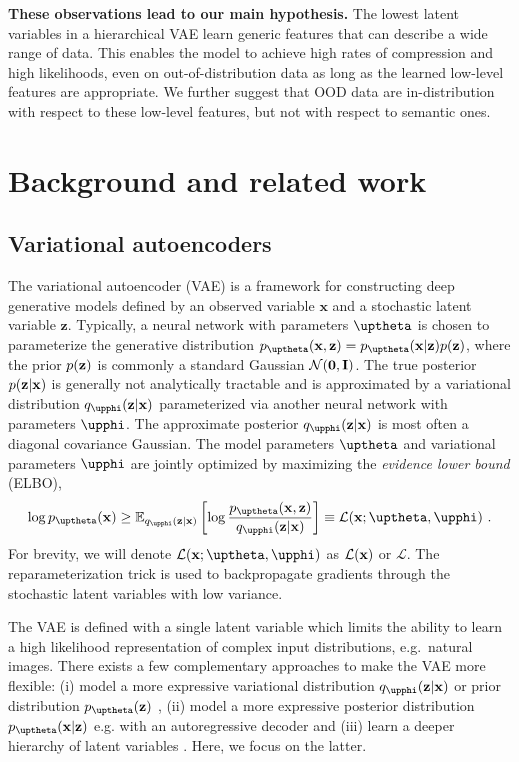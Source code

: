 {\textbf{These observations lead to our main hypothesis.}
The lowest latent variables in a hierarchical VAE learn generic features that can describe a wide range of data.
This enables the model to achieve high rates of compression and high likelihoods, even on out-of-distribution data as long as the learned low-level features are appropriate.
We further suggest that OOD data are in-distribution with respect to these low-level features, but not with respect to semantic ones.

\vspace{0cm}
\section{Background and related work}

\subsection{Variational autoencoders}
The variational autoencoder (VAE) \parencite{kingma_autoencoding_2014, rezende_stochastic_2014} is a framework for constructing deep generative models defined by an observed variable $\mathbf{x}$ and a stochastic latent variable $\mathbf{z}$.
Typically, a neural network with parameters $\thetab$ is chosen to parameterize the generative distribution $p_\thetab(\xb,\zb)=p_\thetab(\xb|\zb)p(\zb)$, where the prior $p({\mathbf{z}})$ is commonly a standard Gaussian $\mathcal{N}({\mathbf{0}}, {\mathbf{I}})$.
The true posterior $p({\mathbf{z}}|{\mathbf{x}})$ is generally not analytically tractable and is approximated by a variational distribution $q_\phib(\zb|\xb)$ parameterized via another neural network with parameters $\phib$. The approximate posterior $q_\phib(\zb|\xb)$ is most often  a diagonal covariance Gaussian.
The model parameters $\thetab$ and variational parameters $\phib$ are jointly optimized by maximizing the \textit{evidence lower bound} (ELBO),
\begin{equation}\label{eq_hierarchical:elbo}
    \log p_\thetab(\xb) \geq \mathbb{E}_{q_\phib(\zb|\xb)} \left[ \log \frac{p_\thetab(\xb,\zb)}{q_\phib(\zb|\xb)} \right] \equiv \mathcal{L}(\xb; \thetab, \phib)\ .
\end{equation}
For brevity, we will denote $\mathcal{L}(\xb; \thetab, \phib)$ as $\mathcal{L}({\mathbf{x}})$ or $\mathcal{L}$. The reparameterization trick is used to backpropagate gradients through the stochastic latent variables with low variance.

The VAE is defined with a single latent variable which limits the ability to learn a high likelihood representation of complex input distributions, e.g.\ natural images.
There exists a few complementary approaches to make the VAE more flexible: (i) model a more expressive variational distribution $q_\phib(\zb|\xb)$ or prior distribution $p_\thetab(\zb)$ \parencite{rezende_variational_2015, kingma_improved_2016}, (ii) model a more expressive posterior distribution $p_\thetab(\xb|\zb)$ e.g. with an autoregressive decoder \parencite{oord_conditional_2016} and (iii) learn a deeper hierarchy of latent variables \parencite{burda_importance_2016, sonderby_ladder_2016}.
Here, we focus on the latter.


}
